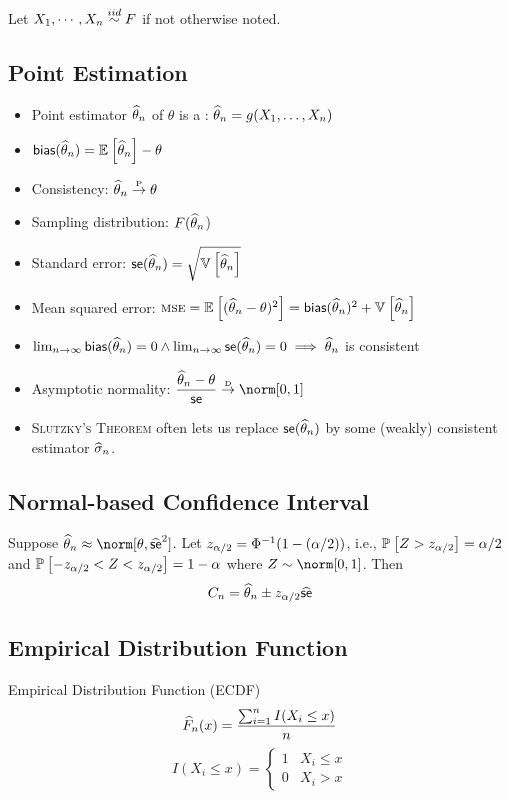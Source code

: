\documentclass[landscape]{article}
\begin{document}
\begin{multicols*}{2}
Let $X_1,\cdots,X_n \stackrel{iid}{\sim} F$ if not otherwise noted.

\subsection{Point Estimation}

\begin{itemize}
  \item Point estimator $\widehat{\theta}_n$ of $\theta$ is a \rv: 
    $\widehat{\theta}_n = g(X_1,\dots,X_n)$
  \item $\textsf{bias}(\widehat{\theta}_n) = \mathbb{E}_{}\left[\widehat{\theta}_n\right]-\theta$
  \item Consistency: $\widehat{\theta}_n \stackrel{\text{\tiny{P}}}{\rightarrow} \theta$
  \item Sampling distribution: $F(\widehat{\theta}_n$)
  \item Standard error: $\textsf{se}(\widehat{\theta}_n) = \sqrt{\mathbb{V}_{}\left[\widehat{\theta}_n\right]}$
  \item Mean squared error: $\textsc{mse} = \mathbb{E}_{}\left[(\widehat{\theta}_n-\theta)^2\right] 
    = \textsf{bias}(\widehat{\theta}_n)^2 + \mathbb{V}_{}\left[\widehat{\theta}_n\right]$
  \item $\lim_{n\to \infty} \textsf{bias}(\widehat{\theta}_n) = 0 \wedge \lim_{n\to \infty}\textsf{se}(\widehat{\theta}_n) = 0 
    \;\Longrightarrow\; \widehat{\theta}_n$ is consistent
  \item Asymptotic normality: 
    $\displaystyle\frac{\that_n-\theta}{\se} \dconv \norm[0,1]$
  \item \textsc{Slutzky's Theorem} often lets us replace $\textsf{se}(\widehat{\theta}_n)$
    by some (weakly) consistent estimator $\widehat{\sigma}_n$.
\end{itemize}

\subsection{Normal-based Confidence Interval}

Suppose $\that_n \approx \norm[\theta,\sehat^2]$. Let $z_{\alpha/2} =
\Phi^{-1}(1-(\alpha/2))$, i.e., $\mathbb{P}_{}\left[Z > z_{\alpha/2}\right] = \alpha/2$ and $\mathbb{P}_{}\left[-z_{\alpha/2} < Z <
z_{\alpha/2}\right] = 1-\alpha$ where $Z\dist\norm[0,1]$. 
Then $$C_n = \widehat{\theta}_n \pm z_{\alpha/2}\widehat{\textsf{se}}$$

\subsection{Empirical Distribution Function}

Empirical Distribution Function (ECDF)
$$\widehat{F}_n(x) = \displaystyle\frac{\sum_{i=1}^n I(X_i \le x)}{n}$$
$$I(X_i \le x) = \begin{cases}
  1 & X_i \le x \\
  0 & X_i > x
\end{cases}$$


\end{multicols*}
\end{document}
